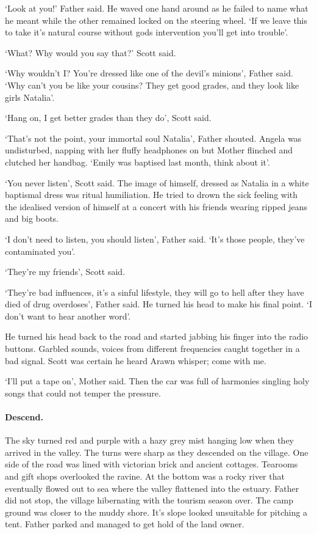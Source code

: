`Look at you!' Father said. He waved one hand around as he failed to
name what he meant while the other remained locked on the steering
wheel. `If we leave this to take it's natural course without gods
intervention you'll get into trouble'.

`What? Why would you say that?' Scott said.

`Why wouldn't I? You're dressed like one of the devil's minions',
Father said. `Why can't you be like your cousins? They get good
grades, and they look like girls Natalia'.

`Hang on, I get better grades than they do', Scott said.

`That's not the point, your immortal soul Natalia', Father
shouted. Angela was undisturbed, napping with her fluffy headphones on
but Mother flinched and clutched her handbag. `Emily was baptised
last month, think about it'.

`You never listen', Scott said. The image of himself, dressed as
Natalia in a white baptismal dress was ritual humiliation. He tried to
drown the sick feeling with the idealised version of himself at a
concert with his friends wearing ripped jeans and big boots.

`I don't need to listen, you should listen', Father said. `It's
those people, they've contaminated you'.

`They're my friends', Scott said.

`They're bad influences, it's a sinful lifestyle, they will go to
hell after they have died of drug overdoses', Father said. He turned
his head to make his final point. `I don't want to hear another
word'.

He turned his head back to the road and started jabbing his finger
into the radio buttons. Garbled sounds, voices from different
frequencies caught together in a bad signal. Scott was certain he
heard Arawn whisper; come with me.

`I'll put a tape on', Mother said. Then the car was full of
harmonies singling holy songs that could not temper the pressure.

\paragraph{Descend.}

The sky turned red and purple with a hazy grey mist hanging low when
they arrived in the valley. The turns were sharp as they descended on
the village. One side of the road was lined with victorian brick and
ancient cottages. Tearooms and gift shops overlooked the ravine. At
the bottom was a rocky river that eventually flowed out to sea where
the valley flattened into the estuary. Father did not stop, the
village hibernating with the tourism season over. The camp ground was
closer to the muddy shore. It's slope looked unsuitable for pitching a
tent. Father parked and managed to get hold of the land owner.

